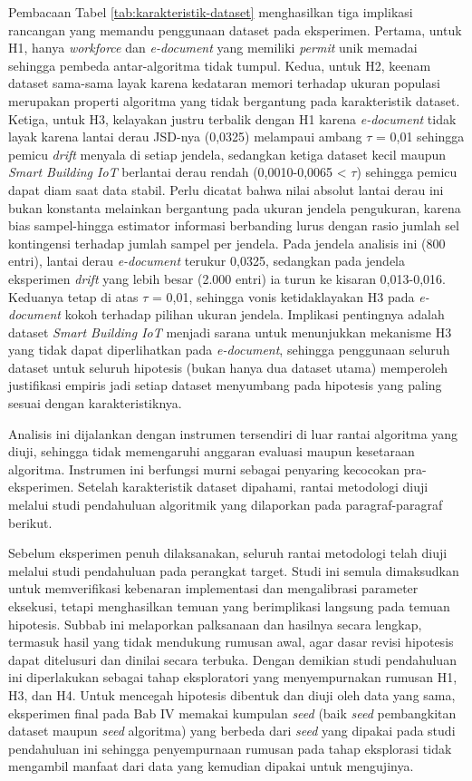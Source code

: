 Pembacaan Tabel \ref{tab:karakteristik-dataset} menghasilkan tiga implikasi rancangan yang memandu penggunaan dataset pada eksperimen.
Pertama, untuk H1, hanya \textit{workforce} dan \textit{e-document} yang memiliki \textit{permit} unik memadai sehingga pembeda antar-algoritma tidak tumpul.
Kedua, untuk H2, keenam dataset sama-sama layak karena kedataran memori terhadap ukuran populasi merupakan properti algoritma yang tidak bergantung pada karakteristik dataset.
Ketiga, untuk H3, kelayakan justru terbalik dengan H1 karena \textit{e-document} tidak layak karena lantai derau JSD-nya (0,0325) melampaui ambang $\tau$ = 0,01 sehingga pemicu \textit{drift} menyala di setiap jendela, sedangkan ketiga dataset kecil maupun \textit{Smart Building IoT} berlantai derau rendah (0,0010-0,0065 < $\tau$) sehingga pemicu dapat diam saat data stabil.
Perlu dicatat bahwa nilai absolut lantai derau ini bukan konstanta melainkan bergantung pada ukuran jendela pengukuran, karena bias sampel-hingga estimator informasi berbanding lurus dengan rasio jumlah sel kontingensi terhadap jumlah sampel per jendela.
Pada jendela analisis ini (800 entri), lantai derau \textit{e-document} terukur 0,0325, sedangkan pada jendela eksperimen \textit{drift} yang lebih besar (2.000 entri) ia turun ke kisaran 0,013-0,016.
Keduanya tetap di atas $\tau$ = 0,01, sehingga vonis ketidaklayakan H3 pada \textit{e-document} kokoh terhadap pilihan ukuran jendela.
Implikasi pentingnya adalah dataset \textit{Smart Building IoT} menjadi sarana untuk menunjukkan mekanisme H3 yang tidak dapat diperlihatkan pada \textit{e-document}, sehingga penggunaan seluruh dataset untuk seluruh hipotesis (bukan hanya dua dataset utama) memperoleh justifikasi empiris jadi setiap dataset menyumbang pada hipotesis yang paling sesuai dengan karakteristiknya.

Analisis ini dijalankan dengan instrumen tersendiri di luar rantai algoritma yang diuji, sehingga tidak memengaruhi anggaran evaluasi maupun kesetaraan algoritma.
Instrumen ini berfungsi murni sebagai penyaring kecocokan pra-eksperimen.
Setelah karakteristik dataset dipahami, rantai metodologi diuji melalui studi pendahuluan algoritmik yang dilaporkan pada paragraf-paragraf berikut.

Sebelum eksperimen penuh dilaksanakan, seluruh rantai metodologi telah diuji melalui studi pendahuluan pada perangkat target.
Studi ini semula dimaksudkan untuk memverifikasi kebenaran implementasi dan mengalibrasi parameter eksekusi, tetapi menghasilkan temuan yang berimplikasi langsung pada temuan hipotesis.
Subbab ini melaporkan palksanaan dan hasilnya secara lengkap, termasuk hasil yang tidak mendukung rumusan awal, agar dasar revisi hipotesis dapat ditelusuri dan dinilai secara terbuka.
Dengan demikian studi pendahuluan ini diperlakukan sebagai tahap eksploratori yang menyempurnakan rumusan H1, H3, dan H4.
Untuk mencegah hipotesis dibentuk dan diuji oleh data yang sama, eksperimen final pada Bab IV memakai kumpulan \textit{seed} (baik \textit{seed} pembangkitan dataset maupun \textit{seed} algoritma) yang berbeda dari \textit{seed} yang dipakai pada studi pendahuluan ini sehingga penyempurnaan rumusan pada tahap eksplorasi tidak mengambil manfaat dari data yang kemudian dipakai untuk mengujinya.

